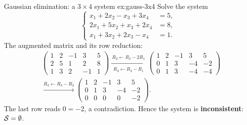\begin{example}{Gaussian elimination: a $3\times 4$ system}%
{ex:gauss-3x4}
Solve the system
\[
  \left\{
  \begin{aligned}
    x_1 + 2x_2 - x_3 + 3x_4 &= 5,\\
    2x_1 + 5x_2 + x_3 + 2x_4 &= 8,\\
    x_1 + 3x_2 + 2x_3 - x_4 &= 1.
  \end{aligned}
  \right.
\]
The augmented matrix and its row reduction:
\begin{align*}
  &\left(\begin{array}{cccc|c}
    1 & 2 & -1 & 3 & 5\\
    2 & 5 & 1 & 2 & 8\\
    1 & 3 & 2 & -1 & 1
  \end{array}\right)
  \xrightarrow[\substack{R_3 \leftarrow R_3 - R_1}]{R_2 \leftarrow R_2 - 2R_1}
  \left(\begin{array}{cccc|c}
    1 & 2 & -1 & 3 & 5\\
    0 & 1 & 3 & -4 & -2\\
    0 & 1 & 3 & -4 & -4
  \end{array}\right)\\[6pt]
  &\xrightarrow{R_3 \leftarrow R_3 - R_2}
  \left(\begin{array}{cccc|c}
    1 & 2 & -1 & 3 & 5\\
    0 & 1 & 3 & -4 & -2\\
    0 & 0 & 0 & 0 & -2
  \end{array}\right).
\end{align*}
The last row reads $0 = -2$, a contradiction. Hence the system is
\textbf{inconsistent}: ${\mathcal{S}} = \emptyset$.
\end{example}

